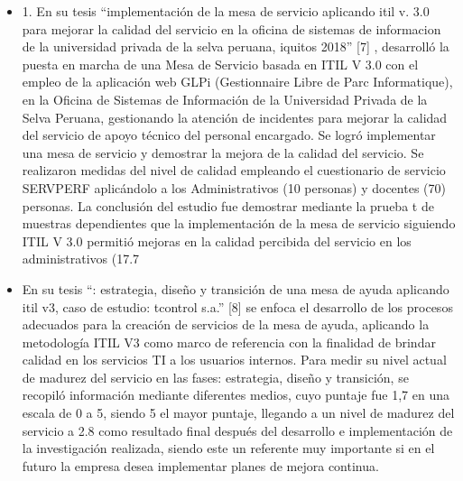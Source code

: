 \begin{itemize}
	\item 1.	En su tesis “implementación de la mesa de servicio aplicando itil v. 3.0 para mejorar la calidad del servicio en la oficina de sistemas de informacion de la universidad privada de la selva peruana, iquitos 2018” [7] , desarrolló la puesta en marcha de una Mesa de Servicio basada en ITIL V 3.0 con el empleo de la aplicación web GLPi (Gestionnaire Libre de Parc Informatique), en la Oficina de Sistemas de Información de la Universidad Privada de la Selva Peruana, gestionando la atención de incidentes para mejorar la calidad del servicio de apoyo técnico del personal encargado. Se logró implementar una mesa de servicio y demostrar la mejora de la calidad del servicio. Se realizaron medidas del nivel de calidad empleando el cuestionario de servicio SERVPERF aplicándolo a los Administrativos (10 personas) y docentes (70) personas. La conclusión del estudio fue demostrar mediante la prueba t de muestras dependientes que la implementación de la mesa de servicio siguiendo ITIL V 3.0 permitió mejoras en la calidad percibida del servicio en los administrativos (17.7%
	
	\item En su tesis “: estrategia, diseño y transición de una mesa de ayuda aplicando itil v3, caso de estudio: tcontrol s.a.” [8] se enfoca el desarrollo de los procesos adecuados para la creación de servicios de la mesa de ayuda, aplicando la metodología ITIL V3 como marco de referencia con la finalidad de brindar calidad en los servicios TI a los usuarios internos. Para medir su nivel actual de madurez del servicio en las fases: estrategia, diseño y transición, se recopiló información mediante diferentes medios, cuyo puntaje fue 1,7 en una escala de 0 a 5, siendo 5 el mayor puntaje, llegando a un nivel de madurez del servicio a 2.8 como resultado final después del desarrollo e implementación de la investigación realizada, siendo este un referente muy importante si en el futuro la empresa desea implementar planes de mejora continua.
	

\end{itemize}
